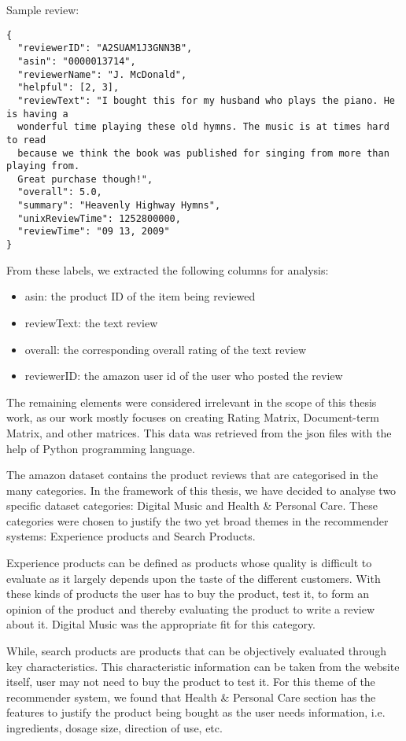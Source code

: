 Sample review:
\begin{verbatim}
{
  "reviewerID": "A2SUAM1J3GNN3B",
  "asin": "0000013714",
  "reviewerName": "J. McDonald",
  "helpful": [2, 3],
  "reviewText": "I bought this for my husband who plays the piano. He is having a 
  wonderful time playing these old hymns. The music is at times hard to read
  because we think the book was published for singing from more than playing from. 
  Great purchase though!",
  "overall": 5.0,
  "summary": "Heavenly Highway Hymns",
  "unixReviewTime": 1252800000,
  "reviewTime": "09 13, 2009"
}
\end{verbatim}

From these labels, we extracted the following columns for analysis:
\begin{itemize}
	\item asin: the product ID of the item being reviewed
	\item reviewText: the text review
	\item overall: the corresponding overall rating of the text review
	\item reviewerID: the amazon user id of the user who posted the review
\end{itemize}

The remaining elements were considered irrelevant in the scope of this thesis work, as our work mostly focuses on creating Rating Matrix, Document-term Matrix, and other matrices. This data was retrieved from the json files with the help of Python programming language.

The amazon dataset contains the product reviews that are categorised in the many categories. In the framework of this thesis, we have decided to analyse two specific dataset categories: Digital Music and Health \& Personal Care. These categories were chosen to justify the two yet broad themes in the recommender systems: Experience products and Search Products. 

Experience products can be defined as products whose quality is difficult to evaluate as it largely depends upon the taste of the different customers. With these kinds of products the user has to buy the product, test it, to form an opinion of the product and thereby evaluating the product to write a review about it. Digital Music was the appropriate fit for this category.

While, search products are products that can be objectively evaluated through key characteristics. This characteristic information can be taken from the website itself, user may not need to buy the product to test it. For this theme of the recommender system, we found that Health \& Personal Care section has the features to justify the product being bought as the user needs information, i.e. ingredients, dosage size, direction of use, etc.

